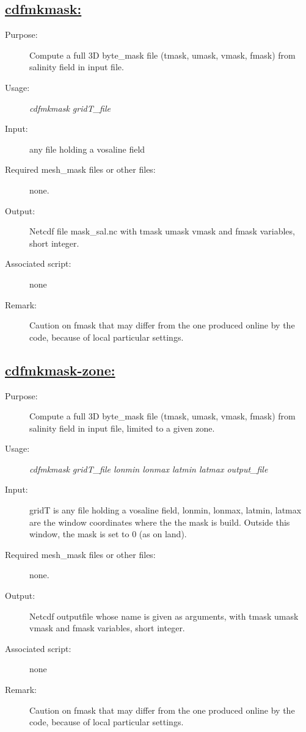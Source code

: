 \documentclass[a4paper,11pt]{article}
\begin{document}
\subsection*{\underline{cdfmkmask:}}
\begin{description}
\item[Purpose:] Compute a full 3D byte\_mask file  (tmask, umask, vmask, fmask) from salinity field in input file.
\item[Usage:] {\em cdfmkmask gridT\_file}
\item[Input:]  any file holding a vosaline field
\item[Required mesh\_mask files or other files:] none.
\item[Output:] Netcdf file mask\_sal.nc with tmask umask vmask and fmask variables, short integer.
\item[Associated script:] none
\item[Remark:] Caution on fmask that may differ from the one produced online by the code, because of local particular settings.
\end{description}

\subsection*{\underline{cdfmkmask-zone:}}
\begin{description}
\item[Purpose:] Compute a full 3D byte\_mask file  (tmask, umask, vmask, fmask) from salinity field in input file, limited to a given zone.
\item[Usage:] {\em cdfmkmask gridT\_file lonmin lonmax latmin latmax output\_file}
\item[Input:]  gridT is any file holding a vosaline field, lonmin, lonmax, latmin, latmax are the window coordinates where the the mask is build. Outside this window, the mask is set to 0 (as on land).
\item[Required mesh\_mask files or other files:] none.
\item[Output:] Netcdf outputfile whose name is given as arguments, with tmask umask vmask and fmask variables, short integer.
\item[Associated script:] none
\item[Remark:] Caution on fmask that may differ from the one produced online by the code, because of local particular settings.
\end{description}
\end{document}
